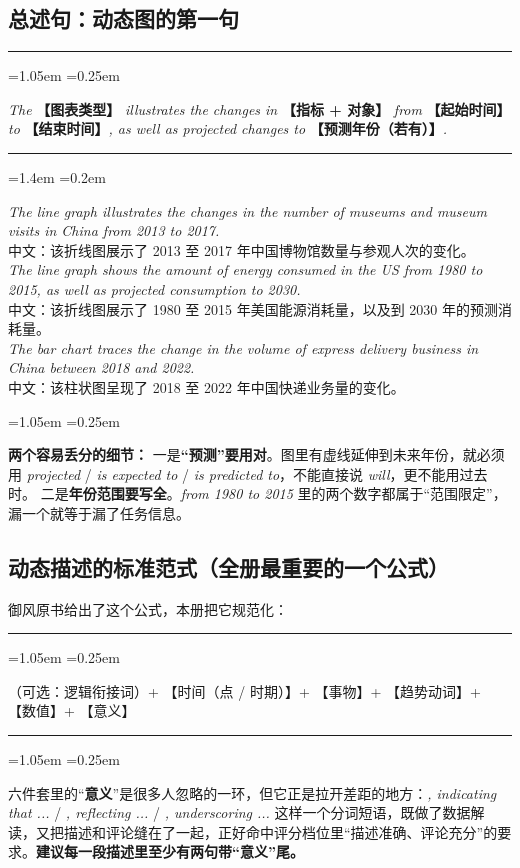 \documentclass[11pt,a4paper]{ctexart}
\newcommand{\fillin}[1]{{\bfseries【#1】}}
\newcommand{\en}[1]{\textit{#1}}
\newenvironment{tpl}[1]{%
  \par\addvspace{7pt}\needspace{4\baselineskip}%
  \noindent{\bfseries\color{accent}#1}\par\nopagebreak
  \vspace{2pt}\noindent\rule{\linewidth}{0.7pt}\par\nopagebreak\vspace{3pt}%
  \begin{list}{}{\leftmargin=1.05em \rightmargin=0.25em \listparindent=0pt
    \itemindent=0pt \topsep=0pt \parsep=2.5pt \itemsep=2.5pt \partopsep=0pt}%
  \item\relax
}{%
  \end{list}\vspace{1pt}\noindent\rule{\linewidth}{0.7pt}\par\addvspace{8pt}%
}
\newenvironment{note}{%
  \par\addvspace{5pt}%
  \begin{list}{}{\leftmargin=1.05em \rightmargin=0.25em \listparindent=0pt
    \itemindent=0pt \topsep=0pt \parsep=2pt \itemsep=2pt \partopsep=0pt}%
  \item\relax\small\color{ink}%
}{%
  \end{list}\addvspace{5pt}%
}
\newenvironment{eg}{%
  \par\addvspace{4pt}%
  \begin{list}{}{\leftmargin=1.4em \rightmargin=0.2em \listparindent=0pt
    \itemindent=0pt \topsep=0pt \parsep=2pt \itemsep=2pt \partopsep=0pt}%
  \item\relax
}{%
  \end{list}\addvspace{5pt}%
}
\begin{document}
\subsection{总述句：动态图的第一句}

\begin{tpl}{总述句公式（动态）}
\en{The} \fillin{图表类型} \en{illustrates the changes in} \fillin{指标 + 对象} \en{from} \fillin{起始时间} \en{to} \fillin{结束时间}\en{, as well as projected changes to} \fillin{预测年份（若有）}\en{.}
\end{tpl}

\begin{eg}
\en{The line graph illustrates the changes in the number of museums and museum visits in China from 2013 to 2017.}\\
中文：该折线图展示了 2013 至 2017 年中国博物馆数量与参观人次的变化。\\[3pt]
\en{The line graph shows the amount of energy consumed in the US from 1980 to 2015, as well as projected consumption to 2030.}\\
中文：该折线图展示了 1980 至 2015 年美国能源消耗量，以及到 2030 年的预测消耗量。\\[3pt]
\en{The bar chart traces the change in the volume of express delivery business in China between 2018 and 2022.}\\
中文：该柱状图呈现了 2018 至 2022 年中国快递业务量的变化。
\end{eg}

\begin{note}
\textbf{两个容易丢分的细节：}
一是\textbf{“预测”要用对}。图里有虚线延伸到未来年份，就必须用 \en{projected} / \en{is expected to} / \en{is predicted to}，不能直接说 \en{will}，更不能用过去时。
二是\textbf{年份范围要写全}。\en{from 1980 to 2015} 里的两个数字都属于“范围限定”，漏一个就等于漏了任务信息。
\end{note}

\subsection{动态描述的标准范式（全册最重要的一个公式）}

御风原书给出了这个公式，本册把它规范化：

\begin{tpl}{动态图描述六件套}
（可选：逻辑衔接词）+ 【时间（点 / 时期）】+ 【事物】+ 【趋势动词】+ 【数值】+ 【意义】
\end{tpl}

\begin{note}
六件套里的“\textbf{意义}”是很多人忽略的一环，但它正是拉开差距的地方：\en{, indicating that ...} / \en{, reflecting ...} / \en{, underscoring ...} 这样一个分词短语，既做了数据解读，又把描述和评论缝在了一起，正好命中评分档位里“描述准确、评论充分”的要求。\textbf{建议每一段描述里至少有两句带“意义”尾。}
\end{note}
\end{document}
